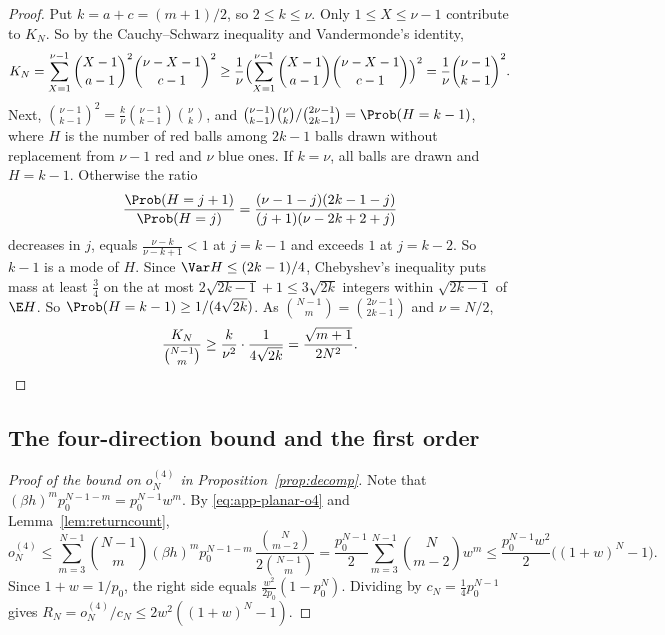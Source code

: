 \begin{proof}
Put $k=a+c=(m+1)/2$, so $2\le k\le\nu$. Only $1\le X\le\nu-1$ contribute to $K_N$. So by the
Cauchy--Schwarz inequality and Vandermonde's identity,
\[
 K_N=\sum_{X=1}^{\nu-1}\binom{X-1}{a-1}^2\binom{\nu-X-1}{c-1}^2
 \ge\frac1\nu\Bigl(\sum_{X=1}^{\nu-1}\binom{X-1}{a-1}\binom{\nu-X-1}{c-1}\Bigr)^2
 =\frac1\nu\binom{\nu-1}{k-1}^2 .
\]
Next, $\binom{\nu-1}{k-1}^2=\frac k\nu\binom{\nu-1}{k-1}\binom\nu k$, and
$\binom{\nu-1}{k-1}\binom\nu k/\binom{2\nu-1}{2k-1}=\Prob(H=k-1)$, where $H$ is the number of red
balls among $2k-1$ balls drawn without replacement from $\nu-1$ red and $\nu$ blue ones. If $k=\nu$,
all balls are drawn and $H=k-1$. Otherwise the ratio
\[
 \frac{\Prob(H=j+1)}{\Prob(H=j)}=\frac{(\nu-1-j)(2k-1-j)}{(j+1)(\nu-2k+2+j)}
\]
decreases in $j$, equals $\frac{\nu-k}{\nu-k+1}<1$ at $j=k-1$ and exceeds $1$ at $j=k-2$. So $k-1$
is a mode of $H$. Since $\Var H\le(2k-1)/4$, Chebyshev's inequality puts mass at least $\frac34$ on
the at most $2\sqrt{2k-1}+1\le3\sqrt{2k}$ integers within $\sqrt{2k-1}$ of $\E H$. So
$\Prob(H=k-1)\ge1/(4\sqrt{2k})$. As $\binom{N-1}m=\binom{2\nu-1}{2k-1}$ and $\nu=N/2$,
\[
 \frac{K_N}{\binom{N-1}m}\ge\frac k{\nu^2}\cdot\frac1{4\sqrt{2k}}=\frac{\sqrt{m+1}}{2N^2}.
 \qedhere
\]
\end{proof}

\subsection{The four-direction bound and the first order}

\begin{proof}[Proof of the bound on $o^{(4)}_N$ in Proposition~\ref{prop:decomp}]
Note that $(\beta h)^mp_0^{N-1-m}=p_0^{N-1}w^m$. By \eqref{eq:app-planar-o4} and
Lemma~\ref{lem:returncount},
\[
 o^{(4)}_N\le\sum_{m=3}^{N-1}\binom{N-1}m(\beta h)^mp_0^{N-1-m}\,\frac{\binom N{m-2}}{2\binom{N-1}m}
 =\frac{p_0^{N-1}}2\sum_{m=3}^{N-1}\binom N{m-2}w^m
 \le\frac{p_0^{N-1}w^2}2\bigl((1+w)^N-1\bigr).
\]
Since $1+w=1/p_0$, the right side equals $\frac{w^2}{2p_0}(1-p_0^N)$. Dividing by
$c_N=\frac14p_0^{N-1}$ gives $R_N=o^{(4)}_N/c_N\le2w^2((1+w)^N-1)$.
\end{proof}

